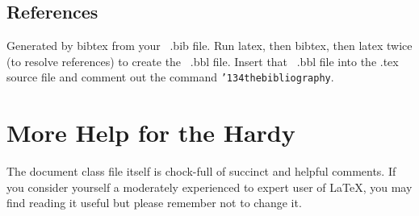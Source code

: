 \documentclass{edm_article}
\begin{document}
\subsection{References}
Generated by bibtex from your ~.bib file.  Run latex,
then bibtex, then latex twice (to resolve references)
to create the ~.bbl file.  Insert that ~.bbl file into
the .tex source file and comment out
the command \texttt{{\char'134}thebibliography}.
\section{More Help for the Hardy}
The document class file itself is chock-full of succinct
and helpful comments.  If you consider yourself a moderately
experienced to expert user of \LaTeX, you may find reading
it useful but please remember not to change it.
\balancecolumns
\end{document}
